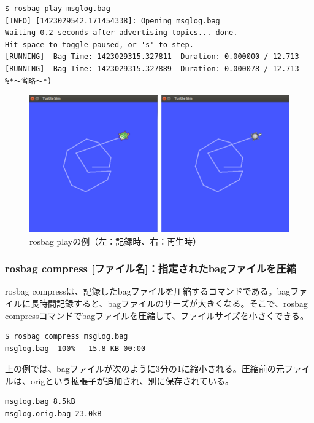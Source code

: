 \begin{lstlisting}[language=ROS]
$ rosbag play msglog.bag
[INFO] [1423029542.171454338]: Opening msglog.bag
Waiting 0.2 seconds after advertising topics... done.
Hit space to toggle paused, or 's' to step.
[RUNNING]  Bag Time: 1423029315.327811  Duration: 0.000000 / 12.713
[RUNNING]  Bag Time: 1423029315.327889  Duration: 0.000078 / 12.713
%*〜省略〜*)
\end{lstlisting}

\begin{figure}[htp]
  \centering
  \includegraphics[width=\columnwidth]{pictures/chapter4/pic_04_05.png}
  \caption{rosbag playの例（左：記録時、右：再生時）}
\end{figure}

\subsubsection{rosbag compress [ファイル名]：指定されたbagファイルを圧縮}

rosbag compressは、記録したbagファイルを圧縮するコマンドである。bagファイルに長時間記録すると、bagファイルのサーズが大きくなる。そこで、rosbag compressコマンドでbagファイルを圧縮して、ファイルサイズを小さくできる。

\begin{lstlisting}[language=ROS]
$ rosbag compress msglog.bag
msglog.bag  100%   15.8 KB 00:00
\end{lstlisting}

上の例では、bagファイルが次のように3分の1に縮小される。圧縮前の元ファイルは、origという拡張子が追加され、別に保存されている。

\begin{lstlisting}[language=ROS]
msglog.bag 8.5kB
msglog.orig.bag 23.0kB
\end{lstlisting}

